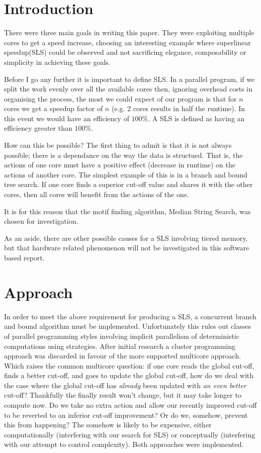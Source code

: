 \documentclass{bioinfo}
\begin{document}
\section{Introduction}

There were three main goals in writing this paper. They were exploiting multiple cores to get a speed increase, choosing an interesting example where superlinear speedup(SLS) could be observed and not sacrificing elegance, composability or simplicity in achieving these goals.

Before I go any further it is important to define SLS. In a parallel program, if we split the work evenly over all the available cores then, ignoring overhead costs in organising the process, the most we could expect of our program is that for $n$ cores we get a speedup factor of $n$ (e.g. 2 cores results in half the runtime). In this event we would have an efficiency of $100\%$. A SLS is defined as having an efficiency greater than $100\%$.

How can this be possible? The first thing to admit is that it is not always possible; there is a dependance on the way the data is structued. That is, the actions of one core must have a positive effect (decrease in runtime) on the actions of another core. The simplest example of this is in a branch and bound tree search. If one core finds a superior cut-off value and shares it with the other cores, then all cores will benefit from the actions of the one.

It is for this reason that the motif finding algorithm, Median String Search, was chosen for investigation.

As an aside, there are other possible causes for a SLS involving tiered memory, but that hardware related phenomenon will not be investigated in this software based report.


\section{Approach}

In order to meet the above requirement for producing a SLS, a concurrent branch and bound algorithm must be implemented. Unfortunately this rules out classes of parallel programming styles involving implicit parallelism of deterministic computations using strategies. After initial research a cluster programming\cite{cloudHaskell} approach was discarded in favour of the more supported multicore approach. Which raises the common multicore question: if one core reads the global cut-off, finds a better cut-off, and goes to update the global cut-off, how do we deal with the case where the global cut-off has \textit{already} been updated with \textit{an even better} cut-off? Thankfully the finally result won't change, but it may take longer to compute now. Do we take no extra action and allow our recently improved cut-off to be reverted to an inferior cut-off improvement? Or do we, somehow, prevent this from happening? The somehow is likely to be expensive, either computationally (interfering with our search for SLS) or conceptually (interfering with our attempt to control complexity). Both approaches were implemented.
\end{document}
